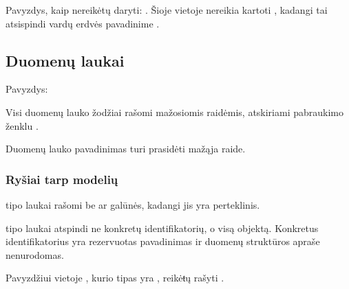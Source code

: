\documentclass[letterpaper,10pt,lithuanian]{sphinxmanual}
\begin{document}
\sphinxAtStartPar
Pavyzdys, kaip nereikėtų daryti: . Šioje
vietoje nereikia kartoti , kadangi tai atsispindi vardų erdvės
pavadinime .


\subsection{Duomenų laukai}
\label{\detokenize{pavadinimai:duomenu-laukai}}
\sphinxAtStartPar
Pavyzdys: 

\sphinxAtStartPar
Visi duomenų lauko žodžiai rašomi mažosiomis raidėmis, atskiriami pabraukimo
ženklu \sphinxcode{\sphinxupquote{\_}}.

\sphinxAtStartPar
Duomenų lauko pavadinimas turi prasidėti mažąja raide.


\subsubsection{Ryšiai tarp modelių}
\label{\detokenize{pavadinimai:rysiai-tarp-modeliu}}
\sphinxAtStartPar
{\hyperref[\detokenize{formatas:ref}]{}} tipo laukai rašomi be  ar  galūnės, kadangi jis yra
perteklinis.

\sphinxAtStartPar
{\hyperref[\detokenize{formatas:ref}]{}} tipo laukai atspindi ne konkretų identifikatorių, o visą
objektą. Konkretus identifikatorius yra rezervuotas pavadinimas ir
duomenų struktūros apraše nenurodomas.

\sphinxAtStartPar
Pavyzdžiui vietoje , kurio tipas yra , reikėŧų rašyti
.
\end{document}
